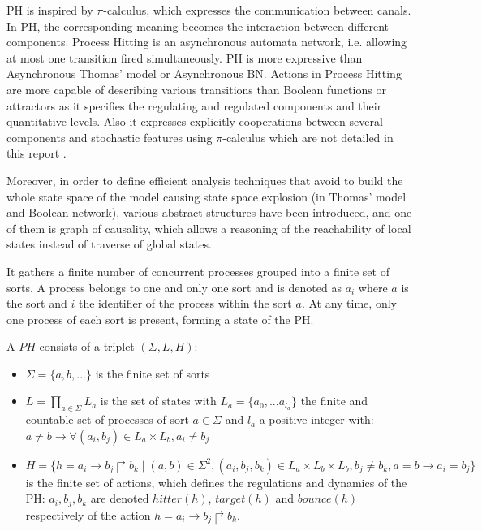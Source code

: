 PH is inspired by $\pi$-calculus, which expresses the communication between canals. 
In PH, the corresponding meaning becomes the interaction between different components.
Process Hitting is an asynchronous automata network, i.e. allowing at most one transition fired simultaneously. 
PH is more expressive than Asynchronous Thomas' model \cite{thomas1978} or Asynchronous BN. 
Actions in Process Hitting are more capable of describing various transitions than Boolean functions or attractors as it specifies the regulating and regulated components and their quantitative levels.
Also it expresses explicitly cooperations between several components and stochastic features using $\pi$-calculus which are not detailed in this report \cite{pauleve2014}.

Moreover, in order to define efficient analysis techniques that avoid to build the whole state space of the model causing state space explosion (in Thomas' model and Boolean network), various abstract structures have been introduced, and one of them is graph of causality, which allows a reasoning of the reachability of local states instead of traverse of global states.

It gathers a finite number of concurrent processes grouped into a finite set of sorts. A process belongs to one and only one sort and is denoted as $a_i$ where $a$ is the sort and $i$ the identifier of the process within the sort $a$.
At any time, only one process of each sort is present, forming a state of the PH.

\begin{definition}
A $PH$ consists of a triplet $(\Sigma, L, H)$:
\begin{itemize}
    \item $\Sigma=\{a,b,...\}$ is the finite set of sorts
    \item $L=\prod_{a\in\Sigma}{L_a}$ is the set of states with $L_a=\{a_0,...a_{l_a}\}$ the finite and countable set of processes of sort $a\in\Sigma$ and $l_a$ a positive integer with: $a\neq b\to \forall(a_i,b_j)\in L_a\times L_b,a_i\neq b_j$
    \item $H=\{h=a_i\to b_j\Rsh b_k\mid(a,b)\in\Sigma^2, (a_i,b_j,b_k)\in L_a\times L_b\times L_b,b_j\neq b_k, a=b\to a_i=b_j\}$ is the finite set of actions, which defines the regulations and dynamics of the PH: $a_i, b_j, b_k$ are denoted $hitter(h)$, $target(h)$ and $bounce(h)$ respectively of the action $h=a_i\to b_j\Rsh b_k$.
\end{itemize}
\end{definition}


